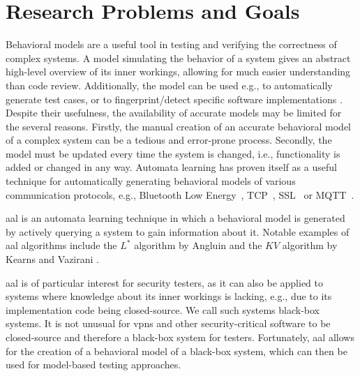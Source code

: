 \section{Research Problems and Goals}
Behavioral models are a useful tool in testing and verifying the correctness of complex systems. A model simulating the behavior of a system gives an abstract high-level overview of its inner workings, allowing for much easier understanding than code review. Additionally, the model can be used e.g., to automatically generate test cases, or to fingerprint/detect specific software implementations \cite{pferscher2021fingerprinting, pferscher2022fuzzing}. Despite their usefulness, the availability of accurate models may be limited for the several reasons. Firstly, the manual creation of an accurate behavioral model of a complex system can be a tedious and error-prone process. Secondly, the model must be updated every time the system is changed, i.e., functionality is added or changed in any way. Automata learning has proven itself as a useful technique for automatically generating behavioral models of various communication protocols, e.g., Bluetooth Low Energy~\cite{pferscher2021fingerprinting}, TCP~\cite{DBLP:conf/cav/Fiterau-Brostean16}, SSL~\cite{DBLP:conf/spin/Fiterau-Brostean17} or MQTT~\cite{DBLP:conf/icst/TapplerAB17}. 

\Ac{aal} is an automata learning technique in which a behavioral model is generated by actively querying a system to gain information about it. Notable examples of \ac{aal} algorithms include the $L^*$ algorithm by Angluin \cite{angluin1987learning} and the $KV$ algorithm by Kearns and Vazirani \cite{KV1994}.

\Ac{aal} is of particular interest for security testers, as it can also be applied to systems where knowledge about its inner workings is lacking, e.g., due to its implementation code being closed-source. We call such systems black-box systems. It is not unusual for \acp{vpn} and other security-critical software to be closed-source and therefore a black-box system for testers. Fortunately, \ac{aal} allows for the creation of a behavioral model of a black-box system, which can then be used for model-based testing approaches.

